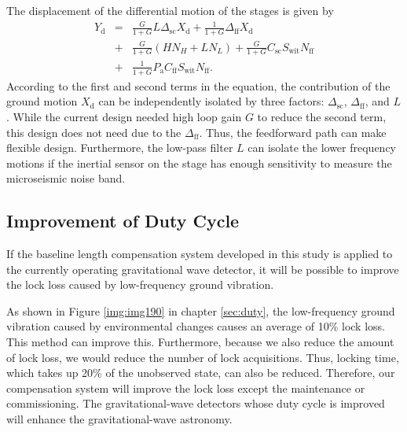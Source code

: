 The displacement of the differential motion of the stages is given by
\begin{eqnarray}\nonumber
  Y_{\mathrm{d}} &=&\frac{G}{1+G}L\Delta_{\mathrm{sc}} X_{\mathrm{d}} + \frac{1}{1+G} \Delta_{\mathrm{ff}} X_{\mathrm{d}}\\ \nonumber
  &+& \frac{G}{1+G}\left(HN_{H}+LN_{L}\right) + \frac{G}{1+G}C_{\mathrm{sc}}S_{\mathrm{wit}}N_{\mathrm{ff}} \\ 
  &+& \frac{1}{1+G}P_{\mathrm{a}} C_{\mathrm{ff}}S_{\mathrm{wit}}N_{\mathrm{ff}} \label{eq:eq520}.
\end{eqnarray}
According to the first and second terms in the equation, the contribution of the ground motion $X_{\mathrm{d}}$ can be independently isolated by three factors: $\Delta_{\mathrm{sc}}$, $\Delta_{\mathrm{ff}}$, and $L$. While the current design needed high loop gain $G$ to reduce the second term, this design does not need due to the $\Delta_{\mathrm{ff}}$. Thus, the feedforward path can make flexible design. Furthermore, the low-pass filter $L$ can isolate the lower frequency motions if the inertial sensor on the stage has enough sensitivity to measure the microseismic noise band.

\subsection{Improvement of Duty Cycle}
If the baseline length compensation system developed in this study is applied to the currently operating gravitational wave detector, it will be possible to improve the lock loss caused by low-frequency ground vibration.

As shown in Figure \ref{img:img190} in chapter \cref{sec:duty}, the low-frequency ground vibration caused by environmental changes causes an average of 10\% lock loss. This method can improve this. Furthermore, because we also reduce the amount of lock loss, we would reduce the number of lock acquisitions. Thus,  locking time, which takes up 20\% of the unobserved state, can also be reduced. Therefore, our compensation system will improve the lock loss except the maintenance or commissioning. The gravitational-wave detectors whose duty cycle is improved will enhance the gravitational-wave astronomy.
